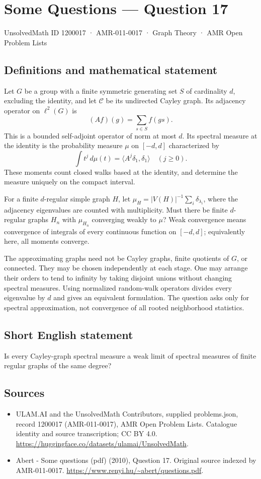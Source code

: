 \documentclass[11pt,a4paper]{article}
\begin{document}
\section*{Some Questions — Question 17}\label{1200017}
{\small UnsolvedMath ID 1200017 · AMR-011-0017 · Graph Theory · AMR Open Problem Lists}
\subsection{Definitions and mathematical statement}
Let $G$ be a group with a finite symmetric generating set $S$ of cardinality $d$, excluding the identity, and let $\mathcal C$ be its undirected Cayley graph. Its adjacency operator on $\ell^2(G)$ is
\[
 (Af)(g)=\sum_{s\in S}f(gs).
\]
This is a bounded self-adjoint operator of norm at most $d$. Its spectral measure at the identity is the probability measure $\mu$ on $[-d,d]$ characterized by
\[
 \int t^j\,d\mu(t)=\langle A^j\delta_1,\delta_1\rangle
                      \quad(j\geq0).
\]
These moments count closed walks based at the identity, and determine the measure uniquely on the compact interval.

For a finite $d$-regular simple graph $H$, let $\mu_H=|V(H)|^{-1}\sum_i\delta_{\lambda_i}$, where the adjacency eigenvalues are counted with multiplicity. Must there be finite $d$-regular graphs $H_n$ with $\mu_{H_n}$ converging weakly to $\mu$? Weak convergence means convergence of integrals of every continuous function on $[-d,d]$; equivalently here, all moments converge.

The approximating graphs need not be Cayley graphs, finite quotients of $G$, or connected. They may be chosen independently at each stage. One may arrange their orders to tend to infinity by taking disjoint unions without changing spectral measures. Using normalized random-walk operators divides every eigenvalue by $d$ and gives an equivalent formulation. The question asks only for spectral approximation, not convergence of all rooted neighborhood statistics.
\subsection{Short English statement}
Is every Cayley-graph spectral measure a weak limit of spectral measures of finite regular graphs of the same degree?
\subsection{Sources}
\begin{itemize}
\item[S1] ULAM.AI and the UnsolvedMath Contributors, supplied problems.json, record 1200017 (AMR-011-0017), AMR Open Problem Lists. Catalogue identity and source transcription; CC BY 4.0.
\url{https://huggingface.co/datasets/ulamai/UnsolvedMath}.
\item[S2] Abert - Some questions (pdf) (2010), Question 17. Original source indexed by AMR-011-0017.
\url{https://www.renyi.hu/~abert/questions.pdf}.
\end{itemize}
\end{document}
